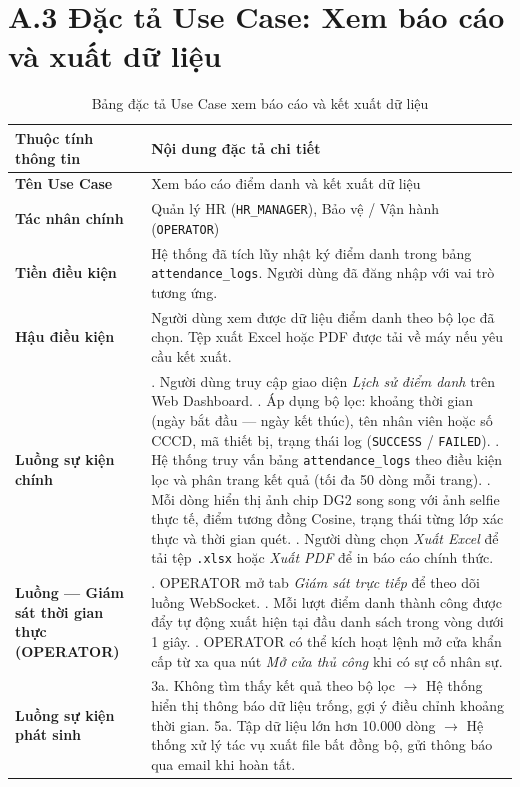 \documentclass[../DoAn.tex]{subfiles}
\begin{document}
\section*{A.3 Đặc tả Use Case: Xem báo cáo và xuất dữ liệu}
\label{appendix:uc_report}

\begin{table}[ht!]
\centering
\small
\renewcommand{\arraystretch}{1.3}
\caption{Bảng đặc tả Use Case xem báo cáo và kết xuất dữ liệu}
\label{tab:uc_report}
\begin{tabular}{|>{\raggedright\arraybackslash}p{3.5cm}|>{\raggedright\arraybackslash}p{10.1cm}|}
\hline
\textbf{Thuộc tính thông tin} & \textbf{Nội dung đặc tả chi tiết} \\ \hline
\textbf{Tên Use Case} & Xem báo cáo điểm danh và kết xuất dữ liệu \\ \hline
\textbf{Tác nhân chính} & Quản lý HR (\texttt{HR\_MANAGER}), Bảo vệ / Vận hành (\texttt{OPERATOR}) \\ \hline
\textbf{Tiền điều kiện} & Hệ thống đã tích lũy nhật ký điểm danh trong bảng \texttt{attendance\_logs}. Người dùng đã đăng nhập với vai trò tương ứng. \\ \hline
\textbf{Hậu điều kiện} & Người dùng xem được dữ liệu điểm danh theo bộ lọc đã chọn. Tệp xuất Excel hoặc PDF được tải về máy nếu yêu cầu kết xuất. \\ \hline
\textbf{Luồng sự kiện chính} &
1. Người dùng truy cập giao diện \textit{Lịch sử điểm danh} trên Web Dashboard. \newline
2. Áp dụng bộ lọc: khoảng thời gian (ngày bắt đầu — ngày kết thúc), tên nhân viên hoặc số CCCD, mã thiết bị, trạng thái log (\texttt{SUCCESS} / \texttt{FAILED}). \newline
3. Hệ thống truy vấn bảng \texttt{attendance\_logs} theo điều kiện lọc và phân trang kết quả (tối đa 50 dòng mỗi trang). \newline
4. Mỗi dòng hiển thị ảnh chip DG2 song song với ảnh selfie thực tế, điểm tương đồng Cosine, trạng thái từng lớp xác thực và thời gian quét. \newline
5. Người dùng chọn \textit{Xuất Excel} để tải tệp \texttt{.xlsx} hoặc \textit{Xuất PDF} để in báo cáo chính thức. \\ \hline
\textbf{Luồng — Giám sát thời gian thực (OPERATOR)} &
1. OPERATOR mở tab \textit{Giám sát trực tiếp} để theo dõi luồng WebSocket. \newline
2. Mỗi lượt điểm danh thành công được đẩy tự động xuất hiện tại đầu danh sách trong vòng dưới 1 giây. \newline
3. OPERATOR có thể kích hoạt lệnh mở cửa khẩn cấp từ xa qua nút \textit{Mở cửa thủ công} khi có sự cố nhân sự. \\ \hline
\textbf{Luồng sự kiện phát sinh} &
3a. Không tìm thấy kết quả theo bộ lọc $\rightarrow$ Hệ thống hiển thị thông báo dữ liệu trống, gợi ý điều chỉnh khoảng thời gian. \newline
5a. Tập dữ liệu lớn hơn 10.000 dòng $\rightarrow$ Hệ thống xử lý tác vụ xuất file bất đồng bộ, gửi thông báo qua email khi hoàn tất. \\ \hline
\end{tabular}
\end{table}
\end{document}
